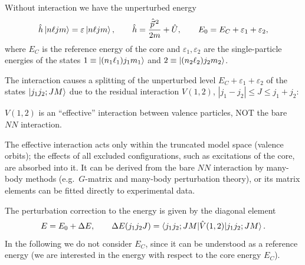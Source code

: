 \documentclass[11pt,a4paper]{article}
\newcommand{\op}[1]{\hat{#1}}
\begin{document}
Without interaction we have the unperturbed energy
\[
\op h\ket{n\ell jm}=\varepsilon\ket{n\ell jm},\qquad \op h=\frac{\op{\vec p}^{\,2}}{2m}+\op U,
\qquad
E_0=E_C+\varepsilon_1+\varepsilon_2 ,
\]
where $E_C$ is the reference energy of the core and $\varepsilon_1,\varepsilon_2$ are the single-particle energies of the states $1\equiv\ket{(n_1\ell_1)j_1m_1}$ and $2\equiv\ket{(n_2\ell_2)j_2m_2}$.

The interaction causes a splitting of the unperturbed level $E_C+\varepsilon_1+\varepsilon_2$ of the states $\ket{j_1j_2;JM}$ due to the residual interaction $V(1,2)$, $|j_1-j_2|\le J\le j_1+j_2$:
\begin{center}
\end{center}
$V(1,2)$ is an ``effective'' interaction between valence particles, NOT the bare $NN$ interaction.

The effective interaction acts only within the truncated model space (valence orbits); the effects of all excluded configurations, such as excitations of the core, are absorbed into it. It can be derived from the bare $NN$ interaction by many-body methods (e.g.\ $G$-matrix and many-body perturbation theory), or its matrix elements can be fitted directly to experimental data.


The perturbation correction to the energy is given by the diagonal element
\[
E=E_0+\Delta E,\qquad \Delta E(j_1j_2J)=\braket{j_1j_2;JM|\op V(1,2)|j_1j_2;JM}.
\]
In the following we do not consider $E_C$, since it can be understood as a reference energy (we are interested in the energy with respect to the core energy $E_C$).
\end{document}
